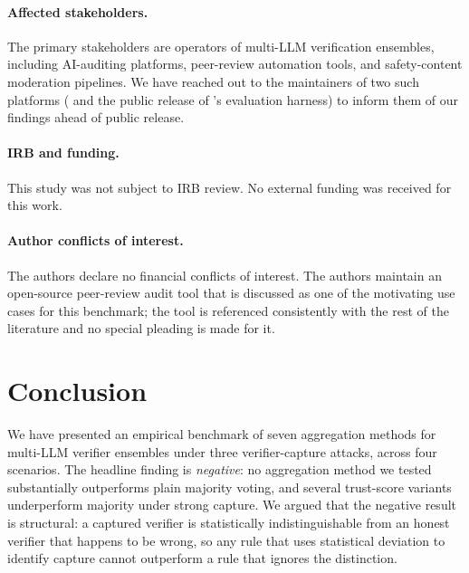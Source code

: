 \documentclass[11pt]{article}
\begin{document}
\paragraph{Affected stakeholders.}
The primary stakeholders are operators of multi-LLM verification
ensembles, including AI-auditing platforms, peer-review automation
tools, and safety-content moderation pipelines. We have reached out
to the maintainers of two such platforms
(\citep{liu2026paperreviewtoolkit} and the public release of
\citet{leung2026rubricllm}'s evaluation harness) to inform them of
our findings ahead of public release.

\paragraph{IRB and funding.}
This study was not subject to IRB review. No external funding was
received for this work.

\paragraph{Author conflicts of interest.}
The authors declare no financial conflicts of interest. The authors
maintain an open-source peer-review audit tool
\citep{liu2026paperreviewtoolkit} that is discussed as one of the
motivating use cases for this benchmark; the tool is referenced
consistently with the rest of the literature and no special pleading
is made for it.

\section{Conclusion}
\label{sec:conclusion}

We have presented an empirical benchmark of seven aggregation methods
for multi-LLM verifier ensembles under three verifier-capture attacks,
across four scenarios. The headline finding is \emph{negative}: no
aggregation method we tested substantially outperforms plain majority
voting, and several trust-score variants underperform majority under
strong capture. We argued that the negative result is structural: a
captured verifier is statistically indistinguishable from an honest
verifier that happens to be wrong, so any rule that uses statistical
deviation to identify capture cannot outperform a rule that ignores
the distinction.
\end{document}

